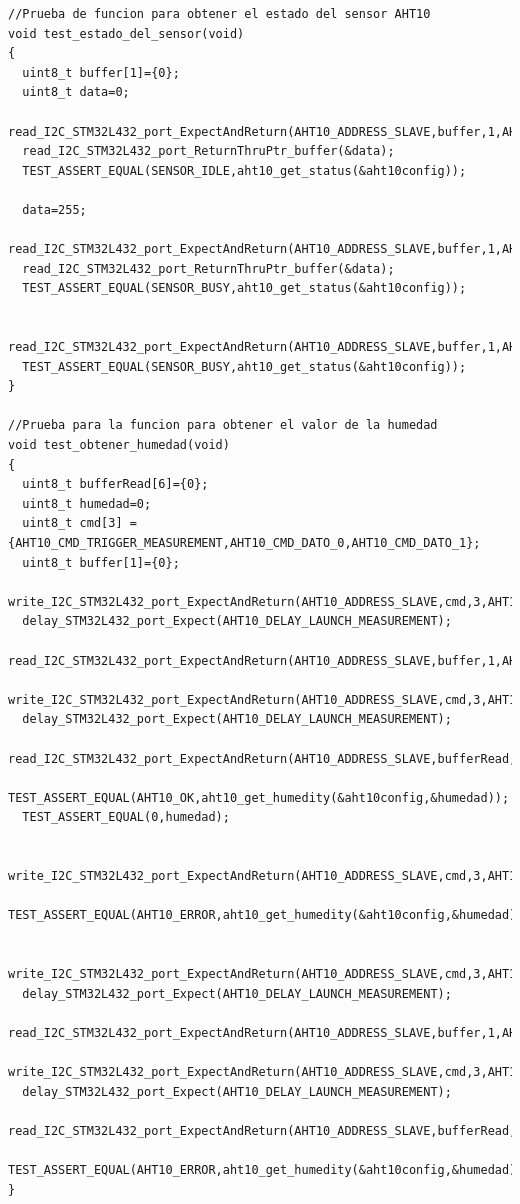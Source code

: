 \begin{lstlisting}[label=cod:codigo test driver AHT10,caption=Tests del driver sensor AHT10.]
//Prueba de funcion para obtener el estado del sensor AHT10
void test_estado_del_sensor(void)
{
  uint8_t buffer[1]={0};
  uint8_t data=0;
  read_I2C_STM32L432_port_ExpectAndReturn(AHT10_ADDRESS_SLAVE,buffer,1,AHT10_OK);
  read_I2C_STM32L432_port_ReturnThruPtr_buffer(&data);
  TEST_ASSERT_EQUAL(SENSOR_IDLE,aht10_get_status(&aht10config));
  
  data=255;
  read_I2C_STM32L432_port_ExpectAndReturn(AHT10_ADDRESS_SLAVE,buffer,1,AHT10_OK);
  read_I2C_STM32L432_port_ReturnThruPtr_buffer(&data);
  TEST_ASSERT_EQUAL(SENSOR_BUSY,aht10_get_status(&aht10config));
  
  read_I2C_STM32L432_port_ExpectAndReturn(AHT10_ADDRESS_SLAVE,buffer,1,AHT10_ERROR);
  TEST_ASSERT_EQUAL(SENSOR_BUSY,aht10_get_status(&aht10config)); 
}

//Prueba para la funcion para obtener el valor de la humedad
void test_obtener_humedad(void)
{
  uint8_t bufferRead[6]={0};
  uint8_t humedad=0;
  uint8_t cmd[3] = {AHT10_CMD_TRIGGER_MEASUREMENT,AHT10_CMD_DATO_0,AHT10_CMD_DATO_1};
  uint8_t buffer[1]={0};
  write_I2C_STM32L432_port_ExpectAndReturn(AHT10_ADDRESS_SLAVE,cmd,3,AHT10_OK);
  delay_STM32L432_port_Expect(AHT10_DELAY_LAUNCH_MEASUREMENT);
  read_I2C_STM32L432_port_ExpectAndReturn(AHT10_ADDRESS_SLAVE,buffer,1,AHT10_OK);
  write_I2C_STM32L432_port_ExpectAndReturn(AHT10_ADDRESS_SLAVE,cmd,3,AHT10_OK);
  delay_STM32L432_port_Expect(AHT10_DELAY_LAUNCH_MEASUREMENT); 
  read_I2C_STM32L432_port_ExpectAndReturn(AHT10_ADDRESS_SLAVE,bufferRead,6,AHT10_OK);
  TEST_ASSERT_EQUAL(AHT10_OK,aht10_get_humedity(&aht10config,&humedad));
  TEST_ASSERT_EQUAL(0,humedad);

  write_I2C_STM32L432_port_ExpectAndReturn(AHT10_ADDRESS_SLAVE,cmd,3,AHT10_ERROR);
  TEST_ASSERT_EQUAL(AHT10_ERROR,aht10_get_humedity(&aht10config,&humedad));

  write_I2C_STM32L432_port_ExpectAndReturn(AHT10_ADDRESS_SLAVE,cmd,3,AHT10_OK);
  delay_STM32L432_port_Expect(AHT10_DELAY_LAUNCH_MEASUREMENT);
  read_I2C_STM32L432_port_ExpectAndReturn(AHT10_ADDRESS_SLAVE,buffer,1,AHT10_OK);
  write_I2C_STM32L432_port_ExpectAndReturn(AHT10_ADDRESS_SLAVE,cmd,3,AHT10_OK);
  delay_STM32L432_port_Expect(AHT10_DELAY_LAUNCH_MEASUREMENT); 
  read_I2C_STM32L432_port_ExpectAndReturn(AHT10_ADDRESS_SLAVE,bufferRead,6,AHT10_ERROR);
  TEST_ASSERT_EQUAL(AHT10_ERROR,aht10_get_humedity(&aht10config,&humedad));
}
\end{lstlisting}


